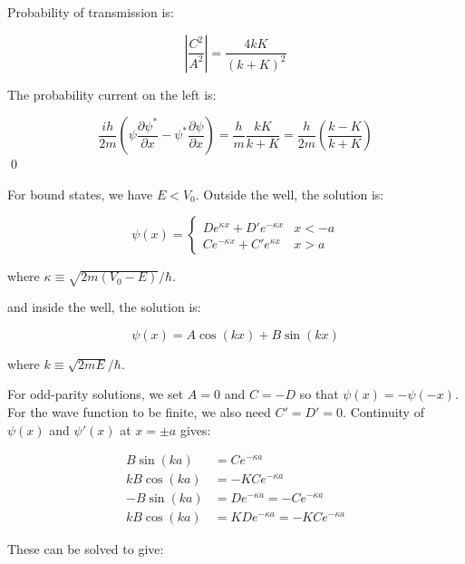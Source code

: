 \documentclass[12pt]{article}
\begin{document}
Probability of transmission is:

\begin{equation}
    \left\lvert \frac{C^{2}}{A^{2}} \right\rvert = \frac{4kK}{(k + K)^{2}}
\end{equation}

The probability current on the left is:

\begin{equation}
    \frac{ih}{2m} \left( \psi \frac{\partial \psi^{*}}{\partial x} - \psi^{*} \frac{\partial \psi}{\partial x} \right) = \frac{h}{m} \frac{kK}{k + K} = \frac{h}{2m} \left( \frac{k - K}{k + K} \right)
\end{equation}
\qed


For bound states, we have $E < V_{0}$. Outside the well, the solution is:

\begin{equation}
    \psi(x) =
    \begin{cases}
        De^{\kappa x} + D'e^{-\kappa x} & x < -a \\
        Ce^{-\kappa x} + C'e^{\kappa x} & x > a
    \end{cases}
\end{equation}

where $\kappa \equiv \sqrt{2m(V_{0} - E)}/\hbar$.

and inside the well, the solution is:

\begin{equation}
\psi(x) = A\cos{(kx)} + B\sin{(kx)}
\end{equation}

where $k \equiv \sqrt{2mE}/\hbar$.

For odd-parity solutions, we set $A = 0$ and $C = -D$ so that $\psi(x) = -\psi(-x)$. For the wave function to be finite, we also need $C' = D' = 0$. Continuity of $\psi(x)$ and $\psi'(x)$ at $x = \pm a$ gives:

\begin{equation}
\begin{split}
    B\sin{(ka)} &= Ce^{-\kappa a} \\
    kB\cos{(ka)} &= -KCe^{-\kappa a} \\
    -B\sin{(ka)} &= De^{-\kappa a} = -Ce^{-\kappa a} \\
    kB\cos{(ka)} &= KDe^{-\kappa a} = -KCe^{-\kappa a}
\end{split}
\end{equation}

These can be solved to give:
\end{document}
